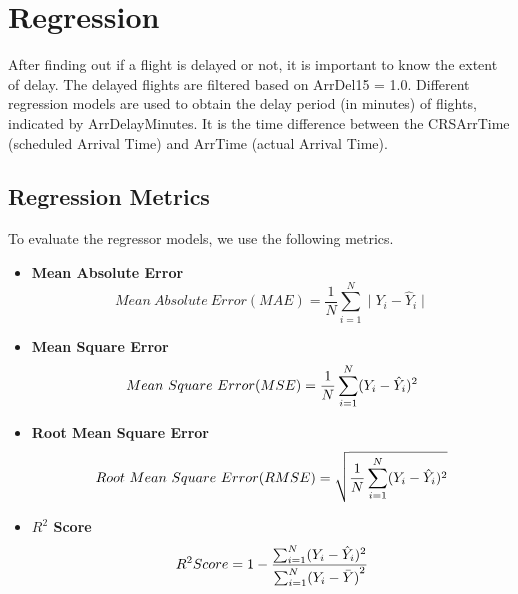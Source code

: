 \documentclass[12pt,letter-paper]{article}
\begin{document}
\section{Regression}

    After finding out if a flight is delayed or not, it is important to know the extent of delay. The delayed flights are filtered based on ArrDel15 = 1.0. Different regression models are used to obtain the delay period (in minutes) of flights, indicated by ArrDelayMinutes. It is the time difference between the CRSArrTime (scheduled Arrival Time) and ArrTime (actual Arrival Time).
    
    \subsection{Regression Metrics}
 
        To evaluate the regressor models, we use the following metrics.
        
        \begin{itemize}
        
            \item\textbf{Mean Absolute Error}
            \begin{equation}
                Mean\ Absolute\ Error(MAE) =  \frac{1}{N}\sum_{i=1}^{N}\mid Y_i - \hat Y_i\mid
            \end{equation}
                
            \item\textbf{Mean Square Error}
            \begin{equation}
                Mean\ Square\ Error(MSE) =  \frac{1}{N}\sum_{i=1}^{N}(Y_i - \hat Y_i)\\^2
            \end{equation}
            
            \item\textbf{Root Mean Square Error}
            \begin{equation}
                Root\ Mean\ Square\ Error(RMSE) =  \sqrt{\frac{1}{N}\sum_{i=1}^{N}(Y_i - \hat Y_i)\\^2}
            \end{equation}
                
            \item\textbf{$R^2$ Score}
            \begin{equation}
                R^2 Score = 1 - \frac{\sum_{i=1}^{N}(Y_i - \hat Y_i)\\^2}{\sum_{i = 1}^{N}({Y_i - \bar{Y})}^2}
            
            \end{equation}
        \end{itemize}
        
\end{document}
